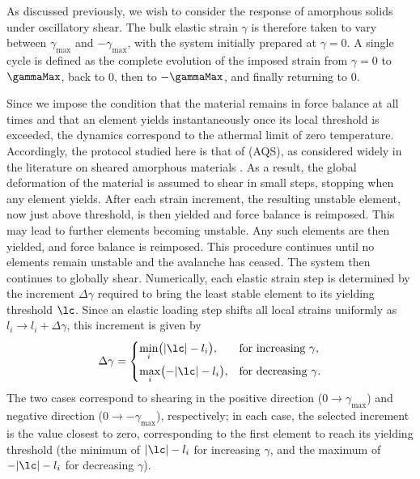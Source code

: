 \documentclass[asymmetricmargins]{library/duthesis}%
\begin{document}
As discussed previously, we wish to consider the response of amorphous solids under oscillatory shear. The bulk elastic strain $\gamma$ is therefore taken to vary between $\gamma_{\max}$ and $-\gamma_{\max}$, with the system initially prepared at $\gamma = 0$. A single cycle is defined as the complete evolution of the imposed strain from $\gamma=0$ to $\gammaMax$, back to $0$, then to $-\gammaMax$, and finally returning to $0$. 

Since we impose the condition that the material remains in force balance at all times and that an element yields instantaneously once its local threshold is exceeded, the dynamics correspond to the athermal limit of zero temperature. Accordingly, the protocol studied here is that of  (AQS), as considered widely in the literature on sheared amorphous materials \cite{liuCreepDynamicsAthermal2018,barlow_ductile_2020,pollard_yielding_2022,maloney_amorphous_2006,Popovi2018,ness_oscillatory_2017,Fiocco2013,Ruscher2021,khandareElastoplasticModellingCyclic2026}. As a result, the global deformation of the material is assumed to shear in small steps, stopping when any element yields. After each strain increment, the resulting unstable element, now just above threshold, is then yielded and force balance is reimposed. This may lead to further elements becoming unstable. Any such elements are then yielded, and force balance is reimposed. This procedure continues until no elements remain unstable and the avalanche has ceased. The system then continues to globally shear. Numerically, each elastic strain step is determined by the increment $\Delta\gamma$ required to bring the least stable element to its yielding threshold $\lc$. Since an elastic loading step shifts all local strains uniformly as $l_i \to l_i + \Delta\gamma$, this increment is given by
\begin{equation*}
\Delta \gamma =
\begin{cases}
\displaystyle \min_i \bigl( |\lc| - l_i \bigr),
& \text{for increasing $\gamma$}, \\[6pt]
\displaystyle \max_i \bigl( -|\lc| - l_i \bigr),
& \text{for decreasing $\gamma$}.
\end{cases}
\end{equation*}
The two cases correspond to shearing in the positive direction ($0 \to \gamma_{\max}$) and negative direction ($0 \to -\gamma_{\max}$), respectively; in each case, the selected increment is the value closest to zero, corresponding to the first element to reach its yielding threshold (the minimum of $|\lc|-l_i$ for increasing $\gamma$, and the maximum of $-|\lc|-l_i$ for decreasing $\gamma$).
\end{document}
